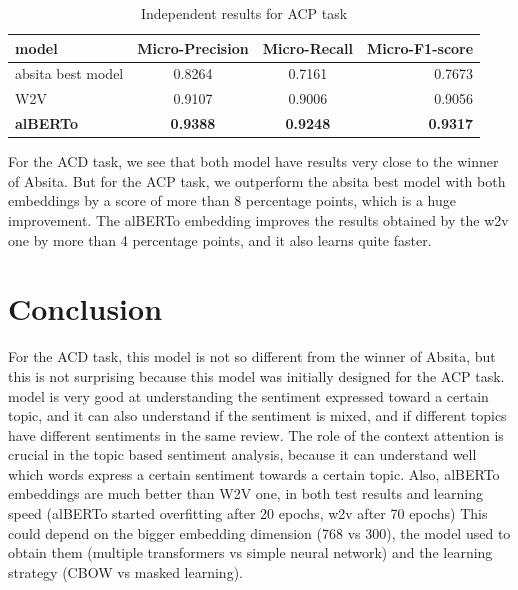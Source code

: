 \documentclass{article}
\begin{document}
                \begin{table}[h!]
                    \begin{center}
                        \caption{Independent results for ACP task}
                        \label{tab:table4}
                        \begin{tabular}{l|c|c|r}
                            \textbf{model} & \textbf{Micro-Precision} & \textbf{Micro-Recall} & \textbf{Micro-F1-score}\\
                            \hline
                                absita best model & 0.8264 & 0.7161 & 0.7673\\
                                W2V & 0.9107 & 0.9006 & 0.9056\\
                                \textbf{alBERTo} & \textbf{0.9388} & \textbf{0.9248} & \textbf{0.9317}\\
                        \end{tabular}
                    \end{center}
                \end{table}
            For the ACD task, we see that both model have results very close to the winner of Absita.
            But for the ACP task, we outperform the absita best model with both embeddings by a score of more than 8 percentage points, which is a huge improvement.
            The alBERTo embedding improves the results obtained by the w2v one by more than 4 percentage points, and it also learns quite faster.

    \section{Conclusion}\label{sec:s6}
        For the ACD task, this model is not so different from the winner of Absita, but this is not surprising because this model was initially designed for the ACP task.
        model is very good at understanding the sentiment expressed toward a certain topic, and it can also understand
        if the sentiment is mixed, and if different topics have different sentiments in the same review.
        The role of the context attention is crucial in the topic based sentiment analysis, because it can understand well which words express a certain sentiment towards a certain topic.
        Also, alBERTo embeddings are much better than W2V one, in both test results and learning speed (alBERTo started overfitting after 20 epochs, w2v after 70 epochs)
        This could depend on the bigger embedding dimension (768 vs 300), the model used to obtain them
        (multiple transformers vs simple neural network) and the learning strategy (CBOW vs masked learning).
\end{document}
